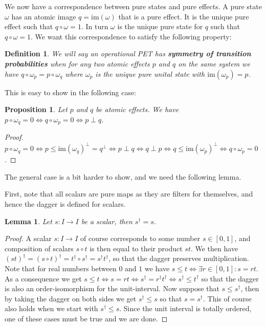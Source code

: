 \documentclass[a4paper,onecolumn,10pt,accepted=2019-05-03, issue=1, volume=1, shorttitle=papers/compositionality-1-1]{compositionalityarticle}
\newcounter{counter}
\numberwithin{counter}{section}
\newtheorem{proposition}[counter]{Proposition}
\newtheorem{definition}[counter]{Definition}
\newtheorem{lemma}[counter]{Lemma}
\newcommand{\im}[1]{\text{im}(#1)}
\begin{document}
\noindent We now have a correspondence between pure states and pure effects. A pure state $\omega$ has an atomic image $q=\im{\omega}$ that is a pure effect. It is the unique pure effect such that $q\circ\omega = 1$. In turn $\omega$ is the unique pure state for $q$ such that $q\circ\omega = 1$. We want this correspondence to satisfy the following property:

\begin{definition}
    We will say an operational PET has \textbf{symmetry of transition probabilities} \cite{alfsen2012geometry} when for any two atomic effects $p$ and $q$ on the same system we have $q\circ \omega_p= p\circ \omega_q$ where $\omega_p$ is the unique pure unital state with $\im{\omega_p}=p$.
\end{definition}

\noindent This is easy to show in the following case:
\begin{proposition}\label{prop:puredistinguish}
	Let $p$ and $q$ be atomic effects. We have $p\circ \omega_q = 0 \iff q\circ \omega_p = 0 \iff p\perp q$.
\end{proposition}
\begin{proof}
	$p\circ \omega_q=0 \iff p\leq \im{\omega_q}^\perp = q^\perp \iff p\perp q \iff q\perp p \iff q\leq \im{\omega_p}^\perp \iff q\circ \omega_p =0$.
\end{proof}

\noindent The general case is a bit harder to show, and we need the following lemma.

First, note that all scalars are pure maps as they are filters for themselves, and hence the dagger is defined for scalars.
\begin{lemma}\label{lem:scalarselfadjoint}
    Let $s: I\rightarrow I$ be a scalar, then $s^\dagger = s$.
\end{lemma}
\begin{proof}
    A scalar $s:I\rightarrow I$ of course corresponds to some number $s\in[0,1]$, and composition of scalars $s\circ t$ is then equal to their product $st$. We then have $(st)^\dagger = (s\circ t)^\dagger = t^\dagger \circ s^\dagger = s^\dagger t^\dagger$, so that the dagger preserves multiplication. 
    Note that for real numbers between $0$ and $1$ we have $s\leq t \iff \exists r\in[0,1]: s = rt$. As a consequence we get $s\leq t \iff s = rt \iff s^\dagger = r^\dagger t^\dagger \iff s^\dagger \leq t^\dagger$ so that the dagger is also an order-isomorphism for the unit-interval.
    Now suppose that $s\leq s^\dagger$, then by taking the dagger on both sides we get $s^\dagger \leq s$ so that $s=s^\dagger$. This of course also holds when we start with $s^\dagger \leq s$. Since the unit interval is totally ordered, one of these cases must be true and we are done.
\end{proof}
\end{document}
